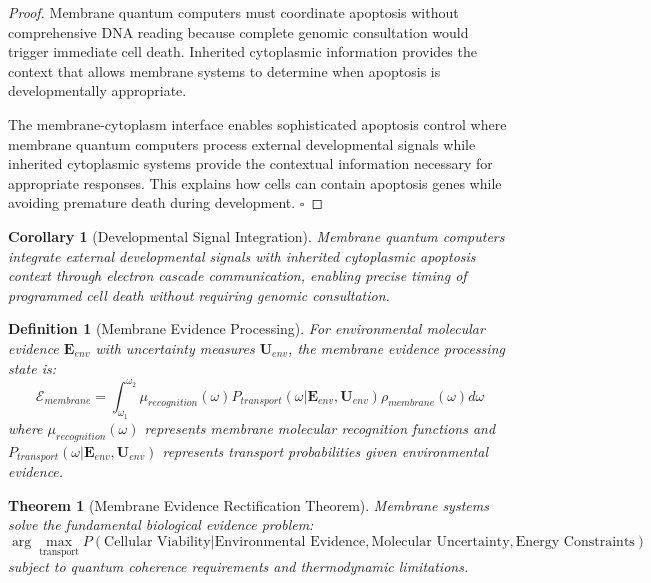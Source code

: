\documentclass[12pt,a4paper]{article}
\newtheorem{theorem}{Theorem}
\newtheorem{definition}{Definition}
\newtheorem{corollary}{Corollary}
\begin{document}
\begin{proof}
Membrane quantum computers must coordinate apoptosis without comprehensive DNA reading because complete genomic consultation would trigger immediate cell death. Inherited cytoplasmic information provides the context that allows membrane systems to determine when apoptosis is developmentally appropriate.

The membrane-cytoplasm interface enables sophisticated apoptosis control where membrane quantum computers process external developmental signals while inherited cytoplasmic systems provide the contextual information necessary for appropriate responses. This explains how cells can contain apoptosis genes while avoiding premature death during development. $\square$
\end{proof}

\begin{corollary}[Developmental Signal Integration]
Membrane quantum computers integrate external developmental signals with inherited cytoplasmic apoptosis context through electron cascade communication, enabling precise timing of programmed cell death without requiring genomic consultation.
\end{corollary}

\begin{definition}[Membrane Evidence Processing]
For environmental molecular evidence $\mathbf{E}_{env}$ with uncertainty measures $\mathbf{U}_{env}$, the membrane evidence processing state is:
\begin{equation}
\mathcal{E}_{membrane} = \int_{\omega_1}^{\omega_2} \mu_{recognition}(\omega) P_{transport}(\omega | \mathbf{E}_{env}, \mathbf{U}_{env}) \rho_{membrane}(\omega) d\omega
\end{equation}
where $\mu_{recognition}(\omega)$ represents membrane molecular recognition functions and $P_{transport}(\omega | \mathbf{E}_{env}, \mathbf{U}_{env})$ represents transport probabilities given environmental evidence.
\end{definition}

\begin{theorem}[Membrane Evidence Rectification Theorem]
Membrane systems solve the fundamental biological evidence problem:
\begin{equation}
\arg\max_{\text{transport}} P(\text{Cellular Viability} | \text{Environmental Evidence}, \text{Molecular Uncertainty}, \text{Energy Constraints})
\end{equation}
subject to quantum coherence requirements and thermodynamic limitations.
\end{theorem}
\end{document}

